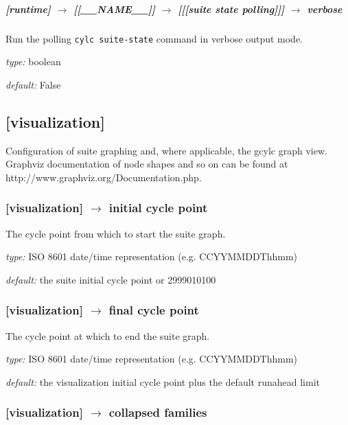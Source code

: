 \subparagraph[verbose]{[runtime] $\rightarrow$ [[\_\_NAME\_\_]] $\rightarrow$ [[[suite state polling]]] $\rightarrow$ verbose}

Run the polling \lstinline=cylc suite-state= command in verbose output mode.

\begin{myitemize}
    \item {\em type:} boolean
    \item {\em default:} False
\end{myitemize}

\subsection{[visualization]}

Configuration of suite graphing and, where applicable, the gcylc graph view.
Graphviz documentation of node shapes and so on can be found at
http://www.graphviz.org/Documentation.php.

\subsubsection[initial cycle point]{[visualization] $\rightarrow$ initial cycle point}

The cycle point from which to start the suite graph.
\begin{myitemize}
    \item {\em type:} ISO 8601 date/time representation (e.g. CCYYMMDDThhmm)
    \item {\em default:} the suite initial cycle point or 2999010100
\end{myitemize}

\subsubsection[final cycle point]{[visualization] $\rightarrow$ final cycle point}

The cycle point at which to end the suite graph.
\begin{myitemize}
    \item {\em type:} ISO 8601 date/time representation (e.g. CCYYMMDDThhmm)
    \item {\em default:} the visualization initial cycle point plus the default runahead limit
\end{myitemize}

\subsubsection[collapsed families]{[visualization] $\rightarrow$ collapsed families}

